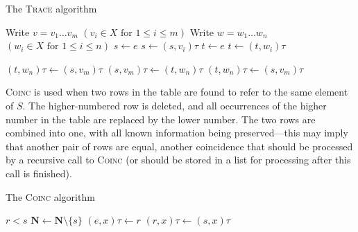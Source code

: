 \begin{algorithm}
\caption{The \textsc{Trace} algorithm}
\label{alg:trace}
\begin{algorithmic}[1]
\State Write $v = v_1 \ldots v_m$ \Comment $(v_i \in X \text{~for~} 1 \leq i \leq m)$
\State Write $w = w_1 \ldots w_n$ \Comment $(w_i \in X \text{~for~} 1 \leq i \leq n)$
\State $s \gets e$
    \State {}
  \EndIf
  \State $s \gets (s, v_i)\tau$
\EndFor
\State $t \gets e$
    \State {}
  \EndIf
  \State $t \gets (t, w_i)\tau$
\EndFor

  \State {}
  \State $(t, w_n)\tau \gets (s, v_m)\tau$
  \State $(s, v_m)\tau \gets (t, w_n)\tau$
  \State $(t, w_n)\tau \gets (s, v_m)\tau$
  \State {}
\EndIf

\EndProcedure
\end{algorithmic}
\end{algorithm}

\textsc{Coinc} is used when two rows in the table are found to refer to the same
element of $S$.  The higher-numbered row is deleted, and all occurrences of the
higher number in the table are replaced by the lower number.  The two rows are
combined into one, with all known information being preserved---this may imply
that another pair of rows are equal, another coincidence that should be
processed by a recursive call to \textsc{Coinc} (or should be stored in a list
for processing after this call is finished).

\begin{algorithm}
\caption{The \textsc{Coinc} algorithm}
\label{alg:coinc}
\begin{algorithmic}[1]
\Require $r < s$
\State $\mathbf{N} \gets \mathbf{N} \setminus \{s\}$
      \State $(e, x)\tau \gets r$
    \EndIf
  \EndFor
\EndFor
{}
    \State $(r, x)\tau \gets (s, x)\tau$
    \State {}
  \EndIf
\EndFor
\EndProcedure
\end{algorithmic}
\end{algorithm}

